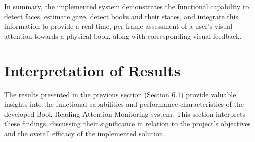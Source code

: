 In summary, the implemented system demonstrates the functional capability to detect faces, estimate gaze, detect books and their states, and integrate this information to provide a real-time, per-frame assessment of a user's visual attention towards a physical book, along with corresponding visual feedback.

\section{Interpretation of Results}
The results presented in the previous section (Section 6.1) provide valuable insights into the functional capabilities and performance characteristics of the developed Book Reading Attention Monitoring system. This section interprets these findings, discussing their significance in relation to the project's objectives and the overall efficacy of the implemented solution.

